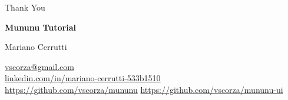 \begin{frame}{Thank You}
  \begin{center}
    {\Large\color{ubaBlue}\textbf{Mununu Tutorial}}

    \bigskip
    Mariano Cerrutti

    \medskip
    {\small\color{ubaGray}
    \href{mailto:vscorza@gmail.com}{vscorza@gmail.com} \\[4pt]
    \href{https://www.linkedin.com/in/mariano-cerrutti-533b1510/}{linkedin.com/in/mariano-cerrutti-533b1510} \\[4pt]
    \href{https://github.com/vscorza/mununu}{https://github.com/vscorza/mununu}
    \href{https://github.com/vscorza/mununu-ui}{https://github.com/vscorza/mununu-ui}
    }
  \end{center}
\end{frame}


